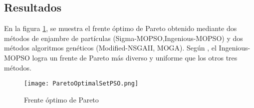 \documentclass[10pt,onecolumn,twoside,letterpaper]{article}
\newcommand{\myreferences}{../../../doc/review/review/library}
\begin{document}
\begin{multicols}{2}
\section{Resultados}
En la figura \ref{fig:pareto}, se muestra el frente \'optimo de Pareto obtenido mediante dos m\'etodos de enjambre de part\'iculas (Sigma-MOPSO,Ingenious-MOPSO) y dos m\'etodos algoritmos gen\'eticos (Modified-NSGAII, MOGA). Seg\'un \cite{Mahmoodabadi2014}, el Ingenious-MOPSO logra un frente de Pareto m\'as diverso y uniforme que los otros tres m\'etodos.
\begin{figure}[H]
  \centering
  \texttt{[image: ParetoOptimalSetPSO.png]}
  \caption{Frente \'optimo de Pareto}
  \label{fig:pareto}
\end{figure}
\end{multicols}

\end{document}
